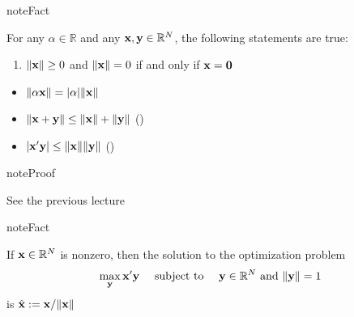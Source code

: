 \documentclass[letterpaper,10pt,english]{jupyterBook}
\begin{document}
\begin{sphinxadmonition}{note}{Fact}

\sphinxAtStartPar
For any \(\alpha \in \mathbb{R}\) and any \({\bf x}, {\bf y} \in \mathbb{R}^N\), the following statements are true:
\begin{enumerate}
%
\item {} 
\sphinxAtStartPar
\(\| {\bf x} \| \geq 0\) and \(\| {\bf x} \| = 0\) if and only if
\({\bf x} = {\bf 0}\)

\end{enumerate}
\begin{itemize}
\item {} 
\sphinxAtStartPar
\(\| \alpha {\bf x} \| = |\alpha| \| {\bf x} \|\)

\item {} 
\sphinxAtStartPar
\(\| {\bf x} + {\bf y} \| \leq \| {\bf x} \| + \| {\bf y} \|\)
()

\item {} 
\sphinxAtStartPar
\(| {\bf x}' {\bf y} | \leq \| {\bf x} \| \| {\bf y} \|\)
()

\end{itemize}
\end{sphinxadmonition}

\begin{sphinxadmonition}{note}{Proof}

\sphinxAtStartPar
See the  previous lecture
\end{sphinxadmonition}

\begin{sphinxadmonition}{note}{Fact}

\sphinxAtStartPar
If \({\bf x} \in \mathbb{R}^N\) is nonzero, then the solution to the optimization problem
\begin{equation*}
\begin{split}
%
\max_{{\bf y}} {\bf x}'{\bf y} 
\quad \text{ subject to } \quad
{\bf y} \in \mathbb{R}^N \text{ and } \| {\bf y} \| = 1 
%
\end{split}
\end{equation*}
\sphinxAtStartPar
is \({\hat{\bf x}} := {\bf x} / \| {\bf x} \|\)
\end{sphinxadmonition}

\begin{figure}[htbp]
\centering

\noindent{}
\end{figure}
\end{document}

